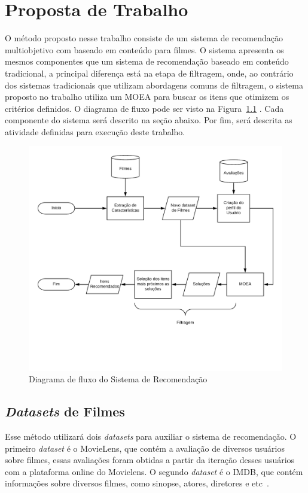 \chapter{Proposta de Trabalho}
O método proposto nesse trabalho consiste de um sistema de recomendação multiobjetivo com baseado em conteúdo para filmes. O sistema apresenta os mesmos componentes que um sistema de recomendação baseado em conteúdo tradicional, a principal diferença está na etapa de filtragem, onde, ao contrário dos sistemas tradicionais que utilizam abordagens comuns de filtragem, o sistema proposto no trabalho utiliza um MOEA para buscar os itens que otimizem os critérios definidos. O diagrama de fluxo pode ser visto na Figura~\ref{fig:fluxo} . Cada componente do sistema será descrito na seção abaixo. Por fim, será descrita as atividade definidas para execução deste trabalho.
\begin{figure}[h!]
   
    \centering
    \includegraphics[width=14cm]{Imagens/algoritmo_fluxo.png}
   \caption{Diagrama de fluxo do  Sistema de Recomendação}
    \label{fig:fluxo}
    
\end{figure}

\section{\textit{Datasets} de Filmes}
Esse método utilizará dois \textit{datasets} para auxiliar o sistema de recomendação. O primeiro \textit{dataset} é o MovieLens\cite{harper2016movielens}, que contém a avaliação de diversos usuários sobre filmes, essas avaliações foram obtidas a partir da iteração desses usuários com a plataforma online do Movielens. O segundo \textit{dataset} é o IMDB, que contém informações sobre diversos filmes, como sinopse, atores, diretores e etc~\cite{imdb}. 

